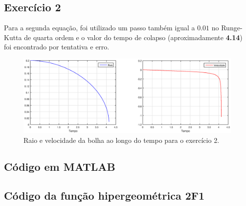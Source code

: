 \documentclass[10pt,a4paper]{article}
\begin{document}
	\subsection{Exercício 2}
	Para a segunda equação, foi utilizado um passo também igual a $0.01$ no Runge-Kutta de quarta ordem e o valor do tempo de colapso (aproximadamente \textbf{4.14}) foi encontrado por tentativa e erro.
	
	\begin{figure}[h!]
    \centering
      \includegraphics[width=1\linewidth]{figures/eq2-h0-01-t-4-14.eps}
      \caption{Raio e velocidade da bolha ao longo do tempo para o exercício 2.}
      \label{fig:raio2}
	\end{figure}
    
    \newpage
    \subsection{Código em MATLAB}
    
    \subsection{Código da função hipergeométrica 2F1}
    
	
\end{document}
